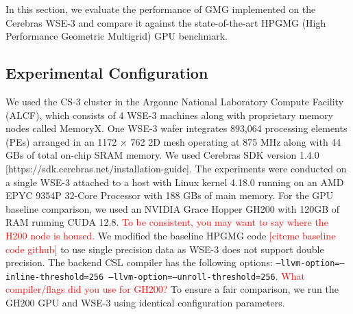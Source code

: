 \documentclass[sigconf]{acmart}
\begin{document}
In this section, we evaluate the performance of %
GMG implemented on the Cerebras WSE-3 %
and compare it against the state-of-the-art %
HPGMG (High Performance Geometric Multigrid) GPU benchmark. %


\subsection{Experimental Configuration}
We used the CS-3 cluster in the Argonne National Laboratory Compute Facility (ALCF), which
consists of 4 WSE-3 machines along with proprietary memory nodes called MemoryX. %
One WSE-3 wafer integrates 893,064 processing elements (PEs) arranged in an 1172 $\times$ 762 2D mesh operating at 875 MHz along with 44 GBs of total on-chip SRAM memory. We used Cerebras SDK version 1.4.0 [https://sdk.cerebras.net/installation-guide]. The experiments were conducted on a single WSE-3 %
attached to a host with Linux kernel 4.18.0 running on an AMD EPYC 9354P 32-Core Processor with 188 GBs of main memory. For the GPU baseline comparison, we used an NVIDIA Grace Hopper GH200 with 120GB of RAM running CUDA 12.8. \textcolor{red}{To be consistent, you may want to say where the H200 node is housed.} We modified the baseline HPGMG code \textcolor{red}{[citeme baseline code github]} 
to use single precision data as WSE-3 does not support double precision.
The backend CSL compiler has the following options: \texttt{--llvm-option=--inline-threshold=256 --llvm-option=--unroll-threshold=256}. \textcolor{red}{What compiler/flags did you use for GH200?} To ensure a fair comparison, we run the GH200 GPU and WSE-3 using identical configuration parameters.
\end{document}
